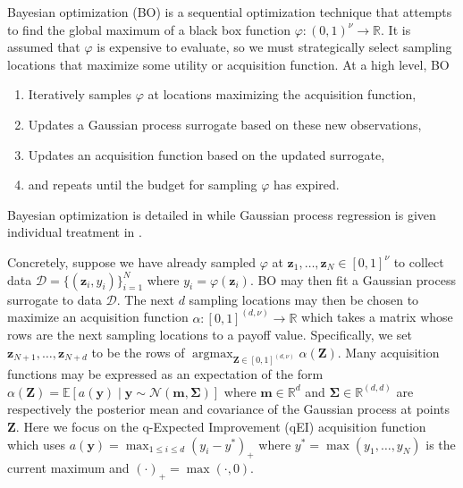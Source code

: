 \documentclass[graybox]{svmult}
\begin{document}
Bayesian optimization (BO) is a sequential optimization technique that attempts to find the global maximum of a black box function $\varphi: (0,1)^{\nu} \to \mathbb{R}$. It is assumed that $\varphi$ is expensive to evaluate, so we must strategically select sampling locations that maximize some utility or acquisition function. At a high level, BO 
\begin{enumerate}
    \item Iteratively samples $\varphi$ at locations maximizing the acquisition function,
    \item Updates a Gaussian process surrogate based on these new observations,
    \item Updates an acquisition function based on the updated surrogate,
    \item and repeats until the budget for sampling $\varphi$ has expired.
\end{enumerate}
Bayesian optimization is detailed in \cite{snoek2012practical} while Gaussian process regression is given individual treatment in \cite{rasmussen2006gaussian}.

Concretely, suppose we have already sampled $\varphi$ at $\boldsymbol{z}_1,\dots,\boldsymbol{z}_{N} \in [0,1]^{\nu}$ to collect data $\mathcal{D}=\{(\boldsymbol{z}_i,y_i)\}_{i=1}^N$ where $y_i = \varphi(\boldsymbol{z}_i)$. BO may then fit a Gaussian process surrogate to data $\mathcal{D}$. The next $d$ sampling locations may then be chosen to maximize an acquisition function $\alpha: [0,1]^{(d,\nu)} \to \mathbb{R}$ which takes a matrix whose rows are the next sampling locations to a payoff value. Specifically, we set $\boldsymbol{z}_{N+1}, \dots, \boldsymbol{z}_{N+d}$ to be the rows of $\mathop{\text{argmax}}_{\boldsymbol{Z} \in [0,1]^{(d,\nu)}}\alpha(\boldsymbol{Z})$. Many acquisition functions may be expressed as an expectation of the form $\alpha(\boldsymbol{Z}) = \mathbb{E}\left[a(\boldsymbol{y}) \mid \boldsymbol{y} \sim \mathcal{N}\left(\boldsymbol{m},\boldsymbol{\Sigma}\right)\right]$ where $\boldsymbol{m} \in \mathbb{R}^{d}$ and  $\boldsymbol{\Sigma} \in \mathbb{R}^{(d,d)}$ are respectively the posterior mean and covariance of the Gaussian process at points $\boldsymbol{Z}$. Here we focus on the q-Expected Improvement (qEI) acquisition function which uses $a(\boldsymbol{y}) = \max_{1 \leq i \leq d} (y_i - y^*)_+$ where $y^*= \max\left(y_1,\dots,y_N\right)$ is the current maximum and $(\cdot)_+ = \max(\cdot,0)$. 
\end{document}
